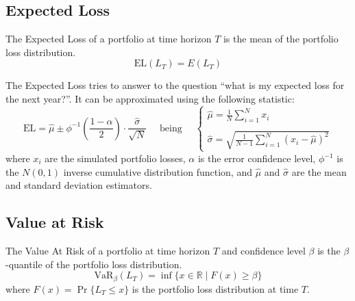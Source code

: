 \documentclass[11pt,fleqn]{book} %
\begin{document}
\subsection{Expected Loss}

\begin{definition}
	The Expected Loss of a portfolio at time horizon $T$ is the 
	mean of the portfolio loss distribution.
	\begin{displaymath}
		\text{EL}(L_T) = E(L_T)
	\end{displaymath}
\end{definition}

The Expected Loss tries to answer to the question \enquote{what is my expected 
loss for the next year?}. It can be approximated using the following 
statistic:
\begin{displaymath}
	\text{EL} = \widehat{\mu} \pm \phi^{-1}\left(\frac{1-\alpha}{2}\right) \cdot \frac{\widehat{\sigma}}{\sqrt{N}}
	\quad \text{ being } \quad
	\left\{
	\begin{array}{l}
		\displaystyle
		\widehat{\mu} = \frac{1}{N} \sum_{i=1}^{N} x_i \\
		\\
		\displaystyle
		\widehat{\sigma} =
		\sqrt{\frac{1}{N-1} \sum_{i=1}^{N} \left( x_i - \widehat{\mu} \right)^2}
	\end{array}
	\right.
\end{displaymath}
where $x_i$ are the simulated portfolio losses, $\alpha$ is the error 
confidence level, $\phi^{-1}$ is the $N(0,1)$ inverse cumulative distribution 
function, and $\widehat{\mu}$ and $\widehat{\sigma}$ are the mean and standard 
deviation estimators.

\subsection{Value at Risk}

\begin{definition}
	The Value At Risk of a portfolio at time horizon $T$ and 
	confidence level $\beta$ is the $\beta$-quantile of the portfolio loss 
	distribution.
	\begin{displaymath}
		\text{VaR}_\beta(L_T) = \inf\{x \in \mathbb{R} \mid F(x) \ge \beta \}
	\end{displaymath}
	where $F(x)=\Pr\{L_T \le x\}$ is the portfolio loss distribution at time $T$.
\end{definition}
\end{document}
